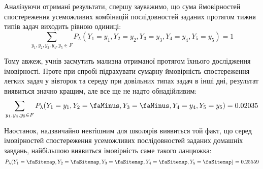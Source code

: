 \vspace{0.4cm}
Аналізуючи отримані результати, спершу зауважимо, що сума ймовірностей спостереження усеможливих комбінацій послідовностей заданих протягом тижня типів задач виходить рівною одиниці:
\begin{equation*}
    \sum\limits_{y_1,y_2,y_3,y_4,y_5\in F}P_\lambda(Y_1=y_1 ,Y_2=y_2,Y_3=y_3,Y_4=y_4,Y_5=y_5) = 1
\end{equation*}

Тому авжеж, учнів засмутить мализна отриманої протягом їхнього дослідження імовірності. Проте при спробі підрахувати сумарну ймовірність спостереження легких задач у вівторок та середу при довільних типах задач в інші дні, результат виявиться значно кращим, але все ще не надто обнадійливим:
\begin{equation*}
    \sum\limits_{y_1,y_4,y_5\in F}P_\lambda(Y_1=y_1 ,Y_2=\text{\faMinus},Y_3=\text{\faMinus},Y_4=y_4,Y_5=y_5) = 0.02035
\end{equation*}

\label{P=0.25559}
Наостанок, надзвичайно невтішним для школярів виявиться той факт, що серед імовірностей спостереження усеможливих послідовностей заданих домашніх завдань, найбільшою виявиться імовірність саме такого ланцюжка:
\begin{equation*}
    P_\lambda(Y_1=\text{\faSitemap},Y_2=\text{\faSitemap},Y_3=\text{\faSitemap},Y_4=\text{\faSitemap},Y_5=\text{\faSitemap}) = 0.25559
\end{equation*}